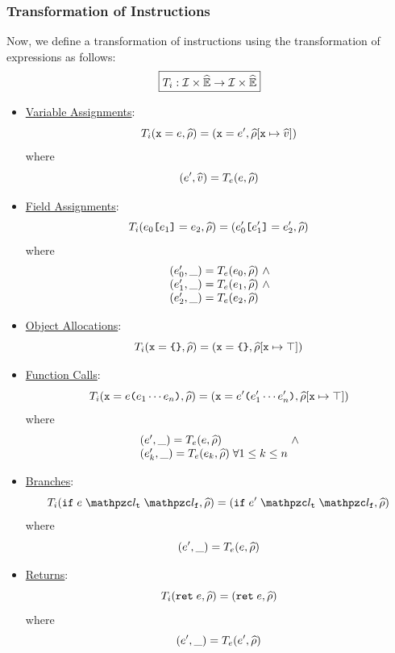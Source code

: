 \subsubsection{Transformation of Instructions} Now, we define a transformation
of instructions using the transformation of expressions as follows:
\[
  \framebox{$\transformi: \instset \times \aenvset \rightarrow \instset \times
  \aenvset$}
\]
\begin{itemize}
  \item \underline{Variable Assignments}:
    \[
      T_i(\texttt{x} = e, \widehat{\rho}) =
      (\texttt{x} = e', \widehat{\rho}[\texttt{x} \mapsto \widehat{v}])
    \]
    where
    \[
      (e', \widehat{v}) = T_e(e, \widehat{\rho})
    \]

  \item \underline{Field Assignments}:
    \[
      T_i(e_0 \texttt{[} e_1 \texttt{]} = e_2, \widehat{\rho}) =
      (e'_0 \texttt{[} e'_1 \texttt{]} = e'_2, \widehat{\rho})
    \]
    where
    \[
      \begin{array}{l@{~}c@{~}ll}
        (\expr'_0, \_) = \transforme(\expr_0, \aenv) &\wedge\\
        (\expr'_1, \_) = \transforme(\expr_1, \aenv) &\wedge\\
        (\expr'_2, \_) = \transforme(\expr_2, \aenv)\\
      \end{array}
    \]
  \item \underline{Object Allocations}:
    \[
      T_i(\texttt{x} = \texttt{\{} \texttt{\}}, \widehat{\rho}) =
      (\texttt{x} = \texttt{\{} \texttt{\}}, \widehat{\rho}[\texttt{x} \mapsto \top])
    \]

  \item \underline{Function Calls}:
    \[
      T_i(\texttt{x} = e \texttt{(} e_1 \cdots e_n \texttt{)}, \widehat{\rho}) =
      (\texttt{x} = e' \texttt{(} e'_1 \cdots e'_n \texttt{)},
      \widehat{\rho}[\texttt{x} \mapsto \top])
    \]
    where
    \[
      \begin{array}{l@{~}c@{~}ll}
        (\expr', \_) = \transforme(\expr, \aenv) &\wedge\\
        (\expr'_k, \_) = \transforme(\expr_k, \aenv) \; \forall 1 \leq k \leq
        n\\
      \end{array}
    \]

  \item \underline{Branches}:
    \[
      \transformi(\kwif \; \expr \; \lab_\vart \; \lab_\varf, \aenv) =
      (\kwif \; \expr' \; \lab_\vart \; \lab_\varf, \aenv)
    \]
    where
    \[
      (e', \_) = T_e(e, \widehat{\rho})
    \]

  \item \underline{Returns}:
    \[
      T_i(\texttt{ret} \; e, \widehat{\rho}) =
      (\texttt{ret} \; e, \widehat{\rho})
    \]
    where
    \[
      (e', \_) = T_e(e', \widehat{\rho})
    \]
\end{itemize}


